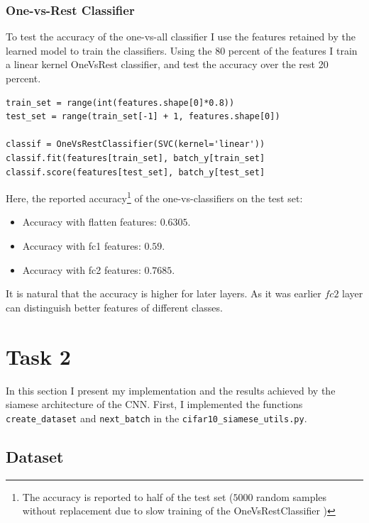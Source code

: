 \documentclass{article}
\begin{document}
\subsubsection{One-vs-Rest Classifier}


To test the accuracy of the one-vs-all classifier I use the features retained by the learned model to train the classifiers.
Using the 80 percent of the features I train a linear kernel OneVsRest classifier, and test the accuracy over the rest 20 percent.
\begin{verbatim}
train_set = range(int(features.shape[0]*0.8))
test_set = range(train_set[-1] + 1, features.shape[0])

classif = OneVsRestClassifier(SVC(kernel='linear'))
classif.fit(features[train_set], batch_y[train_set]
classif.score(features[test_set], batch_y[test_set]
\end{verbatim}
Here, the reported accuracy\footnote{The accuracy is reported to half of the test set ($5000$ random samples without replacement due to slow training of the OneVsRestClassifier		)} of the one-vs-classifiers on the test set:
\begin{itemize}
\item Accuracy with flatten features: $0.6305$.
\item Accuracy with fc1 features: $0.59$.
\item Accuracy with fc2 features: $\mathbf{0.7685}$.
\end{itemize}
It is natural that the accuracy is higher for later layers.
As it was earlier $fc2$ layer can distinguish better features of different classes.




\section{Task 2}

In this section I present my implementation and the results achieved by the siamese architecture of the CNN.		
First, I implemented the functions \texttt{create\_dataset} and \texttt{next\_batch} in the \texttt{cifar10\_siamese\_utils.py}.


\subsection{Dataset}
\end{document}
